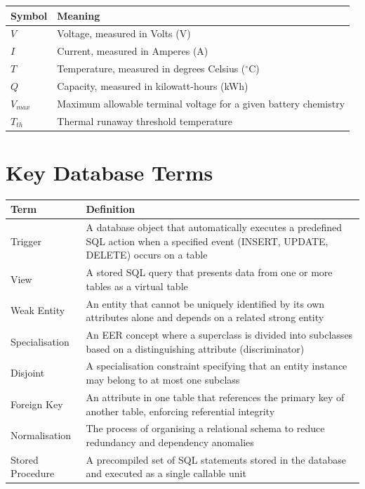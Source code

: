 \documentclass[12pt, a4paper]{report}
\begin{document}
\begin{longtable}{@{} p{3cm} p{11cm} @{}}
    \toprule
    \textbf{Symbol} & \textbf{Meaning} \\
    \midrule
    \endhead
    $V$     & Voltage, measured in Volts (V) \\
    $I$     & Current, measured in Amperes (A) \\
    $T$     & Temperature, measured in degrees Celsius ($^\circ$C) \\
    $Q$     & Capacity, measured in kilowatt-hours (kWh) \\
    $V_{max}$ & Maximum allowable terminal voltage for a given battery chemistry \\
    $T_{th}$ & Thermal runaway threshold temperature \\
    \bottomrule
\end{longtable}

\section*{Key Database Terms}

\begin{longtable}{@{} p{4cm} p{10cm} @{}}
    \toprule
    \textbf{Term} & \textbf{Definition} \\
    \midrule
    \endhead
    Trigger         & A database object that automatically executes a predefined SQL action when a specified event (INSERT, UPDATE, DELETE) occurs on a table \\
    View            & A stored SQL query that presents data from one or more tables as a virtual table \\
    Weak Entity     & An entity that cannot be uniquely identified by its own attributes alone and depends on a related strong entity \\
    Specialisation  & An EER concept where a superclass is divided into subclasses based on a distinguishing attribute (discriminator) \\
    Disjoint        & A specialisation constraint specifying that an entity instance may belong to at most one subclass \\
    Foreign Key     & An attribute in one table that references the primary key of another table, enforcing referential integrity \\
    Normalisation   & The process of organising a relational schema to reduce redundancy and dependency anomalies \\
    Stored Procedure & A precompiled set of SQL statements stored in the database and executed as a single callable unit \\
    \bottomrule
\end{longtable}
\end{document}

